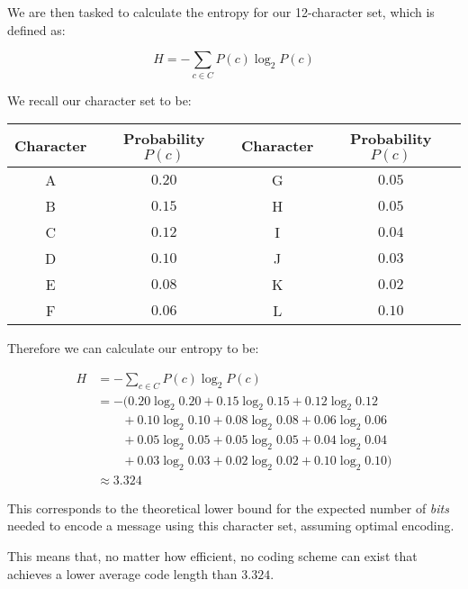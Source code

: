 \documentclass{solutionclass} %
\begin{document}
    \begin{solution}[Question 2]
        We are then tasked to calculate the entropy for our 12-character set, which is defined as:

        \[
        H = -\sum_{c \in C} P(c) \log_2 P(c)
        \]

        We recall our character set to be:

        \vspace{0.5cm}

        \begin{center}
        \begin{tabular}{|c c|c c|}
            \hline
            Character & Probability $P(c)$ & Character & Probability $P(c)$ \\
            \hline
            A & $0.20$ & G & $0.05$ \\
            B & $0.15$ & H & $0.05$ \\
            C & $0.12$ & I & $0.04$ \\
            D & $0.10$ & J & $0.03$ \\
            E & $0.08$ & K & $0.02$ \\
            F & $0.06$ & L & $0.10$ \\
            \hline
        \end{tabular}
    \end{center}

        \vspace{0.5cm}

        Therefore we can calculate our entropy to be:

        \begin{align*}
            H &= -\sum_{c \in C} P(c) \log_2 P(c) \\
              &= -\Big( 
                    0.20 \log_2 0.20 
                  + 0.15 \log_2 0.15 
                  + 0.12 \log_2 0.12 \\
              &\qquad
                  + 0.10 \log_2 0.10 
                  + 0.08 \log_2 0.08 
                  + 0.06 \log_2 0.06 \\
              &\qquad
                  + 0.05 \log_2 0.05 
                  + 0.05 \log_2 0.05
                  + 0.04 \log_2 0.04 \\
              &\qquad
                  + 0.03 \log_2 0.03 
                  + 0.02 \log_2 0.02 
                  + 0.10 \log_2 0.10 
                \Big)\\
            &\approx 3.324
        \end{align*}

        This corresponds to the theoretical lower bound for the expected number of \emph{bits} needed to encode a message using this character set, assuming optimal encoding.

        This means that, no matter how efficient, no coding scheme can exist that achieves a lower average code length than $3.324$.
    \end{solution}
\end{document}
